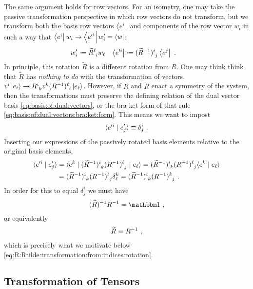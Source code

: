 \documentclass[12pt, oneside]{report}    %
\begin{document}
The same argument holds for row vectors. For an isometry, one may take the passive transformation perspective in which row vectors do not transform, but we transform both the basis row vectors $\left\langle e^i\right|$ and components of the row vector $w_i$ in such a way that $\left\langle e^i\right|w_i \to \left\langle{e'}^i\right|w'_i = \left\langle w\right|$: 
\begin{align}
    w'_i &\defeq \tilde R\aij{\ell}{i} w_\ell
    &
    \bra{e'^i} &\defeq  (\tilde{R}\inv)\aij{i}{j}\bra{e^j} \ .
    \label{eq:passive:transformation:of:row:vector:and:basis}
\end{align}
In principle, this rotation $\tilde R$ is a different rotation from $R$. One may think think that $\tilde R$ has \emph{nothing to do} with the transformation of vectors, $v^i\ket{e_i} \to R\aij{i}{k}v^k(R\inv)\aij{\ell}{i}\ket{e_\ell}$. However, if $R$ and $\tilde R$ enact a symmetry of the system, then the transformations must preserve the defining relation of the dual vector basis \eqref{eq:basis:of:dual:vectors}, or the bra-ket form of that rule \eqref{eq:basis:of:dual:vectors:bra:ket:form}. This means we want to impost
\begin{align}
    \langle e'^i \mid e'_j \rangle \equiv \delta^i_j \ .
\end{align}
Inserting our expressions of the passively rotated basis elements relative to the original basis elements,
\begin{align}
    \la e'^i \mid e'_j \ra &= 
    \la e^k \mid (\tilde{R}\inv)\aij{i}{k} (R\inv)\aij{\ell}{j} \mid e_\ell \ra
    =
    (\tilde{R}\inv)\aij{i}{k} (R\inv)\aij{\ell}{j} \la e^k \mid e_\ell \ra
    \\
    &=
    (\tilde{R}\inv)\aij{i}{k} (R\inv)\aij{\ell}{j} \delta^k_\ell
    =
    (\tilde{R}\inv)\aij{i}{k} (R\inv)\aij{k}{j} \ .
\end{align}
In order for this to equal $\delta^i_j$ we must have
\begin{align}
    (\tilde R)\inv R\inv = \one \ ,
\end{align}
or equivalently
\begin{align}
    \widetilde R = R^{-1} \ ,
\end{align}
which is precisely what we motivate below \eqref{eq:R:Rtilde:transformation:from:indices:rotation}. 


\subsection{Transformation of Tensors}
\end{document}
